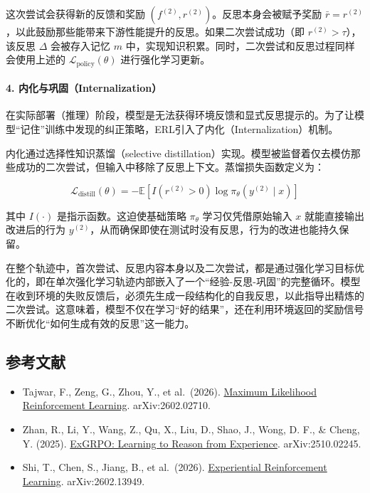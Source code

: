 这次尝试会获得新的反馈和奖励 \((f^{(2)},r^{(2)})\)。反思本身会被赋予奖励 \(\bar{r}=r^{(2)}\)，以此鼓励那些能带来下游性能提升的反思。如果二次尝试成功（即 \(r^{(2)}\gt\tau\)），该反思 \(\Delta\) 会被存入记忆 \(m\) 中，实现知识积累。同时，二次尝试和反思过程同样会使用上述的 \(\mathcal{L}_{\mathrm{policy}}(\theta)\) 进行强化学习更新。

\hypertarget{ux5185ux5316ux4e0eux5de9ux56fainternalization}{%
\paragraph{4. 内化与巩固（Internalization）}\label{ux5185ux5316ux4e0eux5de9ux56fainternalization}}

在实际部署（推理）阶段，模型是无法获得环境反馈和显式反思提示的。为了让模型``记住''训练中发现的纠正策略，ERL引入了内化（Internalization）机制。

内化通过选择性知识蒸馏（selective distillation）实现。模型被监督着仅去模仿那些成功的二次尝试，但输入中移除了反思上下文。蒸馏损失函数定义为：

\[
\mathcal{L}_{\mathrm{distill}}(\theta)=-\mathbb{E}\left[I(r^{(2)}\gt 0)\log\pi_\theta(y^{(2)}\mid x)\right]
\]

其中 \(I(\cdot)\) 是指示函数。这迫使基础策略 \(\pi_\theta\) 学习仅凭借原始输入 \(x\) 就能直接输出改进后的行为 \(y^{(2)}\)，从而确保即使在测试时没有反思，行为的改进也能持久保留。

在整个轨迹中，首次尝试、反思内容本身以及二次尝试，都是通过强化学习目标优化的，即在单次强化学习轨迹内部嵌入了一个``经验-反思-巩固''的完整循环。模型在收到环境的失败反馈后，必须先生成一段结构化的自我反思，以此指导出精炼的二次尝试。这意味着，模型不仅在学习``好的结果''，还在利用环境返回的奖励信号不断优化``如何生成有效的反思''这一能力。

\hypertarget{ux53c2ux8003ux6587ux732e-113}{%
\subsection{参考文献}\label{ux53c2ux8003ux6587ux732e-113}}

\vspace{0.25em}
\begin{itemize}
\tightlist
\item
  Tajwar, F., Zeng, G., Zhou, Y., et al.~(2026). \href{https://arxiv.org/abs/2602.02710}{Maximum Likelihood Reinforcement Learning}. arXiv:2602.02710.
\item
  Zhan, R., Li, Y., Wang, Z., Qu, X., Liu, D., Shao, J., Wong, D. F., \& Cheng, Y. (2025). \href{https://arxiv.org/abs/2510.02245}{ExGRPO: Learning to Reason from Experience}. arXiv:2510.02245.
\item
  Shi, T., Chen, S., Jiang, B., et al.~(2026). \href{https://arxiv.org/abs/2602.13949}{Experiential Reinforcement Learning}. arXiv:2602.13949.
\end{itemize}

\clearpage
